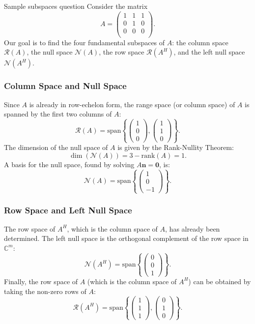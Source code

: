\begin{examplebox}{Sample subspaces question}
    Consider the matrix 
\[
A = \begin{pmatrix}
1 & 1 & 1 \\
0 & 1 & 0 \\
0 & 0 & 0 \\
\end{pmatrix}.
\]
Our goal is to find the four fundamental subspaces of $A$: the column space $\mathcal{R}(A)$, the null space $\mathcal{N}(A)$, the row space $\mathcal{R}(A^H)$, and the left null space $\mathcal{N}(A^H)$.

\subsubsection*{Column Space and Null Space}
Since $A$ is already in row-echelon form, the range space (or column space) of $A$ is spanned by the first two columns of $A$:
\[
\mathcal{R}(A) = \text{span}\left\{ \begin{pmatrix} 1 \\ 0 \\ 0 \end{pmatrix}, \begin{pmatrix} 1 \\ 1 \\ 0 \end{pmatrix} \right\}.
\]
The dimension of the null space of $A$ is given by the Rank-Nullity Theorem:
\[
\dim(\mathcal{N}(A)) = 3 - \text{rank}(A) = 1.
\]
A basis for the null space, found by solving $A\bm{n} = \bm{0}$, is:
\[
\mathcal{N}(A) = \text{span}\left\{ \begin{pmatrix} 1 \\ 0 \\ -1 \end{pmatrix} \right\}.\]

\subsubsection*{Row Space and Left Null Space}
The row space of $A^H$, which is the column space of $A$, has already been determined. The left null space is the orthogonal complement of the row space in $\mathbb{C}^m$:
\[
\mathcal{N}(A^H) = \text{span}\left\{ \begin{pmatrix} 0 \\ 0 \\ 1 \end{pmatrix} \right\}.
\]
Finally, the row space of $A$ (which is the column space of $A^H$) can be obtained by taking the non-zero rows of $A$:
\[
\mathcal{R}(A^H) = \text{span}\left\{ \begin{pmatrix} 1 \\ 1 \\ 1 \end{pmatrix}, \begin{pmatrix} 0 \\ 1 \\ 0 \end{pmatrix} \right\}.
\]
\end{examplebox}


